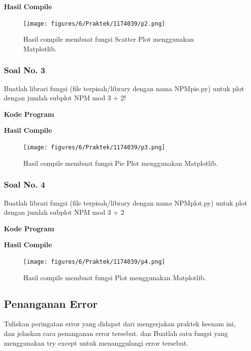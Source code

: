 \hfill \break
\textbf{Hasil Compile}

\begin{figure}[H]
	\texttt{[image: figures/6/Praktek/1174039/p2.png]}
	\centering
	\caption{Hasil compile membuat fungsi Scatter Plot menggunakan Matplotlib.}
\end{figure}

\subsubsection{Soal No. 3}
\hfill \break
Buatlah librari fungsi (file terpisah/library dengan nama NPMpie.py) untuk plot dengan jumlah subplot NPM mod 3 + 2!

\hfill \break
\textbf{Kode Program}



\hfill \break
\textbf{Hasil Compile}

\begin{figure}[H]
	\texttt{[image: figures/6/Praktek/1174039/p3.png]}
	\centering
	\caption{Hasil compile membuat fungsi Pie Plot menggunakan Matplotlib.}
\end{figure}

\subsubsection{Soal No. 4}
\hfill \break
Buatlah librari fungsi (file terpisah/library dengan nama NPMplot.py) untuk plot dengan jumlah subplot NPM mod 3 + 2

\hfill \break
\textbf{Kode Program}



\hfill \break
\textbf{Hasil Compile}

\begin{figure}[H]
	\texttt{[image: figures/6/Praktek/1174039/p4.png]}
	\centering
	\caption{Hasil compile membuat fungsi Plot menggunakan Matplotlib.}
\end{figure}


\subsection{Penanganan Error}
Tuliskan  peringatan  error  yang  didapat  dari  mengerjakan  praktek  keenam  ini, dan  jelaskan  cara  penanganan  error  tersebut. dan  Buatlah  satu  fungsi  yang menggunakan try except untuk menanggulangi error tersebut.

